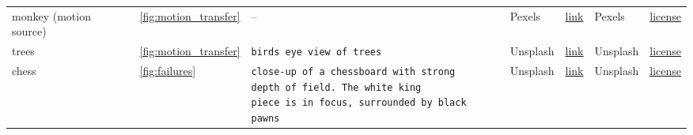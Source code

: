 \begin{table}[t]
\begin{center}
{\begin{tabular}{@{\hspace{3mm}}lllllll}
    monkey (motion source) & \cref{fig:motion_transfer} & \;-- & Pexels & \href{https://www.pexels.com/video/close-up-footage-of-a-monkey-eating-its-food-7710018/}{link} & Pexels & \href{https://www.pexels.com/license/}{license} \\ \cmidrule(lr){1-7}
    
    trees & \cref{fig:motion_transfer} & \texttt{birds eye view of trees} & Unsplash & \href{https://unsplash.com/photos/aerial-view-of-green-trees-EI0pK6euSKE}{link} & Unsplash & \href{https://unsplash.com/license}{license} \\ \cmidrule(lr){1-7}
    
    chess & \cref{fig:failures} & \makecell[l]{\texttt{close-up of a chessboard with strong} \\ \texttt{depth of field. The white king} \\ \texttt{piece is in focus, surrounded by black pawns}} & Unsplash & \href{https://unsplash.com/photos/a-close-up-of-a-chess-board-with-pieces-on-it-y5nGbO1u8mA}{link} & Unsplash & \href{https://unsplash.com/license}{license} \\
    
    \bottomrule
    \end{tabular}
   }
    \end{center}
\aftertab
\end{table}
